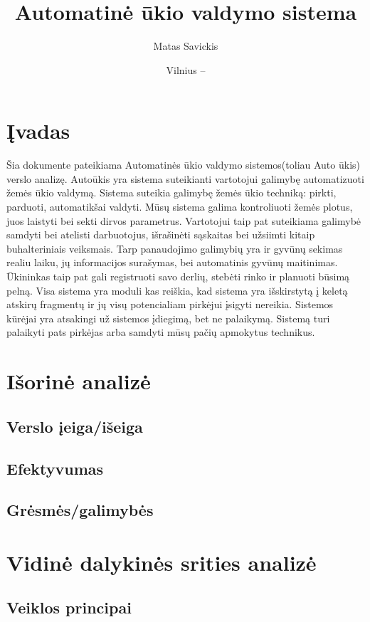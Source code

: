 \documentclass[oneside]{VUMIFPSkursinis}
\title{Automatinė ūkio valdymo sistema}
\author{Matas Savickis}
\date{Vilnius – \the\year}
\begin{document}
\maketitle
\centering
\tableofcontents


\section{Įvadas}
Šia dokumente pateikiama Automatinės ūkio valdymo sistemos(toliau Auto ūkis) verslo analizę. Autoūkis yra sistema suteikianti vartotojui galimybę automatizuoti žemės ūkio valdymą. Sistema suteikia galimybę žemės ūkio techniką: pirkti, parduoti, automatikšai valdyti. Mūsų sistema galima kontroliuoti žemės plotus, juos laistyti bei sekti dirvos parametrus. Vartotojui taip pat suteikiama galimybė samdyti bei atelisti darbuotojus, išrašinėti sąskaitas bei užsiimti kitaip buhalteriniais veiksmais. Tarp panaudojimo galimybių yra ir gyvūnų sekimas realiu laiku, jų informacijos surašymas, bei automatinis gyvūnų maitinimas. Ūkininkas taip pat gali registruoti savo derlių, stebėti rinko ir planuoti būsimą pelną. Visa sistema yra moduli kas reiškia, kad sistema yra išskirstytą į keletą atskirų fragmentų ir jų visų potencialiam pirkėjui įsigyti nereikia. Sistemos kūrėjai yra atsakingi už sistemos įdiegimą, bet ne palaikymą. Sistemą turi palaikyti pats pirkėjas arba samdyti mūsų pačių apmokytus technikus.

\section{Išorinė analizė}
	\subsection{Verslo įeiga/išeiga}
	\subsection{Efektyvumas}
	\subsection{Grėsmės/galimybės}
\section{Vidinė dalykinės srities analizė}
	\subsection{Veiklos principai}
\end{document}
